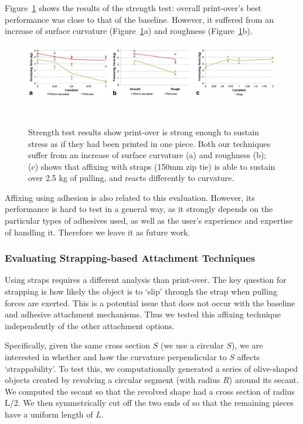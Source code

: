 Figure~\ref{fig:encore_eval_result} shows the results of the strength test: overall print-over's best performance was close to that of the baseline. However, it suffered from an increase of surface curvature (Figure~\ref{fig:encore_eval_result}a) and roughness (Figure~\ref{fig:encore_eval_result}b).

\begin{figure}[h]
  \centering
  \includegraphics[width=1\textwidth]{figures/encore_evaluation_results.pdf}
  \caption{Strength test results show print-over is strong enough to sustain stress as if they had been printed in one piece. Both our techniques suffer from an increase of surface curvature (a) and roughness (b); (c) shows that affixing with straps (150mm zip tie) is able to sustain over 2.5 kg of pulling, and reacts differently to curvature. }~\label{fig:encore_eval_result}
\end{figure}


Affixing using adhesion is also related to this evaluation. However, its performance is hard to test in a general way, as it strongly depends on the particular types of adhesives used, as well as the user's experience and expertise of handling it. Therefore we leave it as future work.

\subsubsection{Evaluating Strapping-based Attachment Techniques}
Using straps requires a different analysis than print-over. The key question for strapping is how likely the object is to ‘slip' through the strap when pulling forces are exerted. This is a potential issue that does not occur with the baseline and adhesive attachment mechanisms. Thus we tested this affixing technique independently of the other attachment options.

Specifically, given the same cross section $S$ (we use a circular $S$), we are interested in whether and how the curvature perpendicular to $S$ affects `strappability'. To test this, we computationally generated a series of olive-shaped objects created by revolving a circular segment (with radius $R$) around its secant. We computed the secant so that the revolved shape had a cross section of radius L/2. We then symmetrically cut off the two ends of so that the remaining pieces have a uniform length of $L$.

